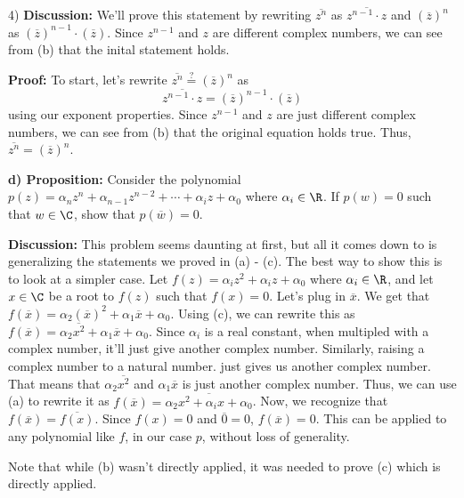 \begin{paragraph}{4)}
        \textbf{Discussion:} We'll prove this statement by rewriting $\overline{z^n}$
        as $\overline{z^{n-1} \cdot z}$ and $(\overline{z})^n$ as 
        $(\overline{z})^{n-1} \cdot (\overline{z})$.
        Since $z^{n-1}$ and $z$ are different complex numbers, we can see from (b)
        that the inital statement holds.
        \spacing

        \textbf{Proof:} To start, let's rewrite $\overline{z^n} \stackrel{?}{=} (\overline{z})^n$
        as $$\overline{z^{n - 1} \cdot z} = (\overline{z})^{n-1} \cdot (\overline{z})$$
        using our exponent properties. Since $z^{n-1}$ and $z$ are just different complex numbers, we can see from 
        (b) that the original equation holds true. Thus, $\overline{z^n} = (\overline{z})^n$.\\
        \proofEnd\pagebreak

        \textbf{d) Proposition:} Consider the polynomial $p(z) = \alpha_nz^n + \alpha_{n-1}z^{n-2} + \cdots +\alpha_iz + \alpha_0$ where $\alpha_i \in \R$. If $p(w) = 0$ such that $w \in \C$, show that $p(\overline{w}) = 0$.
        \spacing

        \textbf{Discussion:} This problem seems daunting at first, but all it comes down to is generalizing 
        the statements we proved in (a) - (c). The best way to show this is to look at a simpler case. 
        Let $f(z)=\alpha_iz^2 +\alpha_iz + \alpha_0$ where $\alpha_i \in \R$, and let $x \in \C$ be a root to $f(z)$ such that $f(x) = 0$.
        Let's plug in $\overline{x}$. We get that $f(\overline{x}) = \alpha_2(\overline{x})^2 + \alpha_1\overline{x} + \alpha_0$. 
        Using (c), we can rewrite this as $f(\overline{x}) = \alpha_2\overline{x^2} + \alpha_1\overline{x} + \alpha_0$.
        Since $\alpha_i$ is a real constant, when multipled with a complex number, it'll just give another complex number.
        Similarly, raising a complex number to a natural number. just gives us another complex number. That means that 
        $\alpha_2\overline{x^2}$ and $\alpha_1\overline{x}$ is just another complex number.
        Thus, we can use (a) to rewrite it as $f(\overline{x}) = \overline{\alpha_2x^2 +\alpha_ix + \alpha_0}$.
        Now, we recognize that $f(\overline{x}) = \overline{f(x)}$. Since $f(x) = 0$ and
        $\overline{0} = 0$, $f(\overline{x}) = 0$. This can be applied to any polynomial like $f$, 
        in our case $p$, without loss of generality.
        \spacing
        
        Note that while (b) wasn't directly applied, it was needed to prove (c) which is directly applied.
        \spacing


\end{paragraph}
